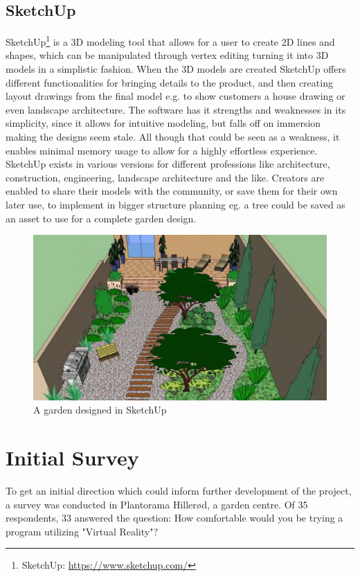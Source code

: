 		
		\subsection{SketchUp}
			SketchUp\footnote{SketchUp: \url{https://www.sketchup.com/}} is a 3D modeling tool that allows for a user to create 2D lines and shapes, which can be manipulated through vertex editing turning it into 3D models in a simplistic fashion. When the 3D models are created SketchUp offers different functionalities for bringing details to the product, and then creating layout drawings from the final	model e.g. to show customers a house drawing or even landscape architecture. The software has it strengths and weaknesses in its simplicity, since it allows for intuitive modeling, but falls off on immersion making the designs seem stale. All though that could be seen as a weakness, it enables minimal memory usage to allow for a highly effortless experience. \\
			
			SketchUp exists in various versions for different professions like architecture, construction, engineering, landscape architecture and the like. Creators are enabled to share their models with the community, or save them for their own later use, to implement in bigger structure planning eg. a tree could be saved as an asset to use for a complete garden design.
			
				\begin{figure}[H]
					\centering
					\includegraphics[width=0.6\linewidth]{figure/Analysis/sketchupgarden}
					\caption{A garden designed in SketchUp}
					\label{fig:sketchupgarden}
				\end{figure}
			
				\section{Initial Survey}
			
			To get an initial direction which could inform further development of the project, a survey was conducted in Plantorama Hillerød, a garden centre. Of 35 respondents, 33 answered the question: How comfortable would you be trying a program utilizing "Virtual Reality"?
			
